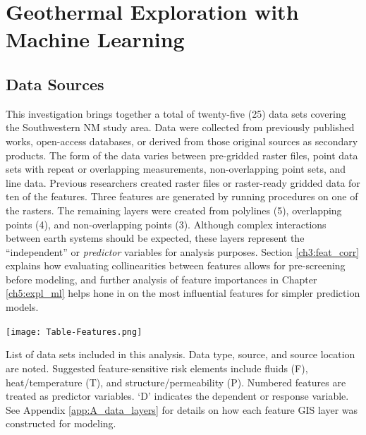\chapter{Geothermal Exploration with Machine Learning}\label{ch3:expl_ml_prep}
\section{Data Sources}\label{ch3:expl_data_src}
This investigation brings together a total of twenty-five (25) data sets covering the Southwestern NM study area. Data were collected from previously published works, open-access databases, or derived from those original sources as secondary products. The form of the data varies between pre-gridded raster files, point data sets with repeat or overlapping measurements, non-overlapping point sets, and line data. Previous researchers created raster files or raster-ready gridded data for ten of the features. Three features are generated by running procedures on one of the rasters. The remaining layers were created from polylines (5), overlapping points (4), and non-overlapping points (3). Although complex interactions between earth systems should be expected, these layers represent the ``independent'' or \textit{predictor} variables for analysis purposes. Section \ref{ch3:feat_corr} explains how evaluating collinearities between features allows for pre-screening before modeling, and further analysis of feature importances in Chapter \ref{ch5:expl_ml} helps hone in on the most influential features for simpler prediction models.

\begin{table}
\centering
\texttt{[image: Table-Features.png]}
\caption[Southwestern New Mexico feature list]{List of data sets included in this analysis. Data type, source, and source location are noted. Suggested feature-sensitive risk elements include fluids (F), heat/temperature (T), and structure/permeability (P). Numbered features are treated as predictor variables. `D' indicates the dependent or response variable. See Appendix \ref{app:A_data_layers} for details on how each feature GIS layer was constructed for modeling.}
\label{tab:features}
\end{table}

